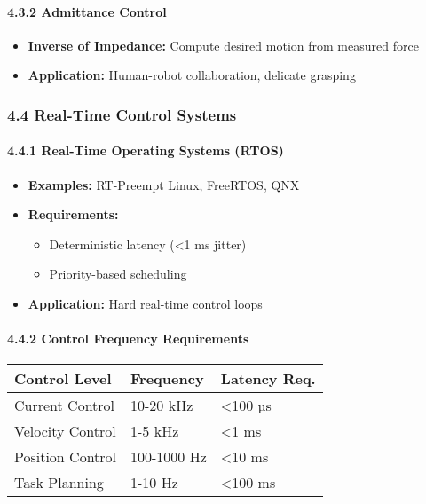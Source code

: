 \documentclass[
]{article}
\providecommand{\tightlist}{%
  \setlength{\itemsep}{0pt}\setlength{\parskip}{0pt}}
\begin{document}
\hypertarget{admittance-control}{%
\paragraph{4.3.2 Admittance Control}\label{admittance-control}}

\begin{itemize}
\tightlist
\item
  \textbf{Inverse of Impedance:} Compute desired motion from measured
  force
\item
  \textbf{Application:} Human-robot collaboration, delicate grasping
\end{itemize}

\hypertarget{real-time-control-systems}{%
\subsubsection{4.4 Real-Time Control
Systems}\label{real-time-control-systems}}

\hypertarget{real-time-operating-systems-rtos}{%
\paragraph{4.4.1 Real-Time Operating Systems
(RTOS)}\label{real-time-operating-systems-rtos}}

\begin{itemize}
\tightlist
\item
  \textbf{Examples:} RT-Preempt Linux, FreeRTOS, QNX
\item
  \textbf{Requirements:}

  \begin{itemize}
  \tightlist
  \item
    Deterministic latency (\textless1 ms jitter)
  \item
    Priority-based scheduling
  \end{itemize}
\item
  \textbf{Application:} Hard real-time control loops
\end{itemize}

\hypertarget{control-frequency-requirements}{%
\paragraph{4.4.2 Control Frequency
Requirements}\label{control-frequency-requirements}}

\begin{longtable}[]{@{}lll@{}}
\toprule\noalign{}
Control Level & Frequency & Latency Req. \\
\midrule\noalign{}
\endhead
\bottomrule\noalign{}
\endlastfoot
Current Control & 10-20 kHz & \textless100 µs \\
Velocity Control & 1-5 kHz & \textless1 ms \\
Position Control & 100-1000 Hz & \textless10 ms \\
Task Planning & 1-10 Hz & \textless100 ms \\
\end{longtable}
\end{document}
